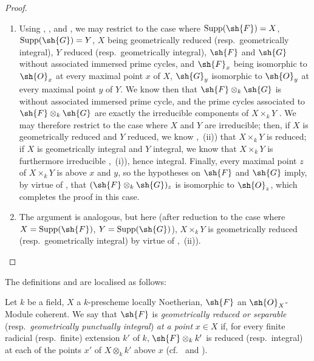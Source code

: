 \begin{proof}
\begin{enumerate}[label=(\roman*)]
  \item Using , , and , we may restrict to the case where $\operatorname{Supp}(\sh{F})=X$, $\operatorname{Supp}(\sh{G})=Y$, $X$ being geometrically reduced (resp.\ geometrically integral), $Y$ reduced (resp.\ geometrically integral), $\sh{F}$ and $\sh{G}$ without associated immersed prime cycles, and $\sh{F}_x$ being isomorphic to $\sh{O}_x$ at every maximal point $x$ of $X$, $\sh{G}_y$ isomorphic to $\sh{O}_y$ at every maximal point $y$ of $Y$.
We know then  that $\sh{F}\otimes_k\sh{G}$ is without associated immersed prime cycle, and the prime cycles associated to $\sh{F}\otimes_k\sh{G}$ are exactly the irreducible components of $X\times_k Y$ .
We may therefore restrict to the case where $X$ and $Y$ are irreducible; then, if $X$ is geometrically reduced and $Y$ reduced, we know ,~(ii)) that $X\times_k Y$ is reduced; if $X$ is geometrically integral and $Y$ integral, we know that $X\times_k Y$ is furthermore irreducible ,~(i)), hence integral.
Finally, every maximal point $z$ of $X\times_k Y$ is above $x$ and $y$, so the hypotheses on $\sh{F}$ and $\sh{G}$ imply, by virtue of , that $(\sh{F}\otimes_k\sh{G})_z$ is isomorphic to $\sh{O}_z$, which completes the proof in this case.
  \item The argument is analogous, but here (after reduction to the case where $X=\operatorname{Supp}(\sh{F})$, $Y=\operatorname{Supp}(\sh{G})$), $X\times_k Y$ is geometrically reduced (resp.\ geometrically integral) by virtue of ,~(ii)).
\end{enumerate}
\end{proof}

The definitions  and  are localised as follows:

\begin{definition}[4.6.22]
\label{IV.4.6.22}
Let $k$ be a field, $X$ a $k$-prescheme locally Noetherian, $\sh{F}$ an $\sh{O}_X$-Module coherent.
We say that $\sh{F}$ is \emph{geometrically reduced or separable} (resp.\ \emph{geometrically punctually integral}) \emph{at a point} $x\in X$ if, for every finite radicial (resp.\ finite) extension $k'$ of $k$, $\sh{F}\otimes_k k'$ is reduced (resp.\ integral) at each of the points $x'$ of $X\otimes_k k'$ above $x$ (cf.\  and ).
\end{definition}

